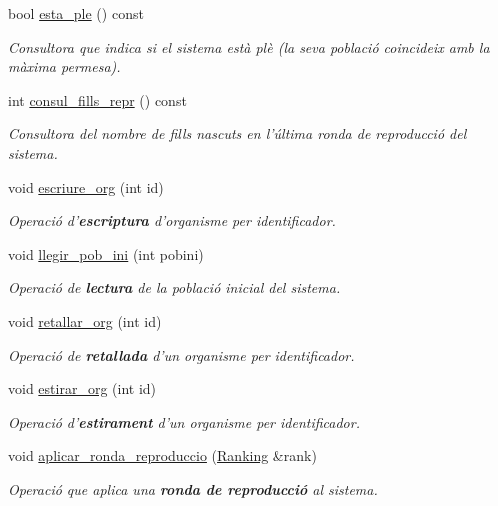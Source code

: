 \begin{DoxyCompactItemize}
bool \hyperlink{class_sistema_adbaf521a9576706bf2212f7ce24d2d0e}{esta\-\_\-ple} () const 
\begin{DoxyCompactList}\small\item\em Consultora que indica si el sistema està plè (la seva població coincideix amb la màxima permesa). \end{DoxyCompactList}\item 
int \hyperlink{class_sistema_ad7f3d8c32a3792fec6c4641769c07c04}{consul\-\_\-fills\-\_\-repr} () const 
\begin{DoxyCompactList}\small\item\em Consultora del nombre de fills nascuts en l'última ronda de reproducció del sistema. \end{DoxyCompactList}\item 
void \hyperlink{class_sistema_ad3028a34f72a19d63a2d126bb4422b5b}{escriure\-\_\-org} (int id)
\begin{DoxyCompactList}\small\item\em Operació d'{\bfseries escriptura} d'organisme per identificador. \end{DoxyCompactList}\item 
void \hyperlink{class_sistema_a6fe943c69b0f8b76d7ea9696867f4fa1}{llegir\-\_\-pob\-\_\-ini} (int pobini)
\begin{DoxyCompactList}\small\item\em Operació de {\bfseries lectura} de la població inicial del sistema. \end{DoxyCompactList}\item 
void \hyperlink{class_sistema_a873e9e89616d383f864191304f804063}{retallar\-\_\-org} (int id)
\begin{DoxyCompactList}\small\item\em Operació de {\bfseries retallada} d'un organisme per identificador. \end{DoxyCompactList}\item 
void \hyperlink{class_sistema_abe6ae69cefc9adb10b7650635b1f7336}{estirar\-\_\-org} (int id)
\begin{DoxyCompactList}\small\item\em Operació d'{\bfseries estirament} d'un organisme per identificador. \end{DoxyCompactList}\item 
void \hyperlink{class_sistema_a63e70593ee3bcd19f8e2e2b0d525906c}{aplicar\-\_\-ronda\-\_\-reproduccio} (\hyperlink{class_ranking}{Ranking} \&rank)
\begin{DoxyCompactList}\small\item\em Operació que aplica una {\bfseries ronda de reproducció} al sistema. \end{DoxyCompactList}\end{DoxyCompactItemize}
